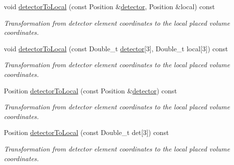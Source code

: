 \begin{DoxyCompactItemize}
void \hyperlink{class_d_d4hep_1_1_alignments_1_1_alignment_data_ae82379c6de7ca0295a39a876303377b5}{detector\+To\+Local} (const Position \&\hyperlink{class_d_d4hep_1_1_alignments_1_1_alignment_data_abf7096d1f2d3ed307c361f2d6d03710e}{detector}, Position \&local) const
\begin{DoxyCompactList}\small\item\em Transformation from detector element coordinates to the local placed volume coordinates. \end{DoxyCompactList}\item 
void \hyperlink{class_d_d4hep_1_1_alignments_1_1_alignment_data_a3cd2f3d20d1a277a1145a3257f2badf1}{detector\+To\+Local} (const Double\+\_\+t \hyperlink{class_d_d4hep_1_1_alignments_1_1_alignment_data_abf7096d1f2d3ed307c361f2d6d03710e}{detector}\mbox{[}3\mbox{]}, Double\+\_\+t local\mbox{[}3\mbox{]}) const
\begin{DoxyCompactList}\small\item\em Transformation from detector element coordinates to the local placed volume coordinates. \end{DoxyCompactList}\item 
Position \hyperlink{class_d_d4hep_1_1_alignments_1_1_alignment_data_a50c1fafca870e727b494ac639a4ba419}{detector\+To\+Local} (const Position \&\hyperlink{class_d_d4hep_1_1_alignments_1_1_alignment_data_abf7096d1f2d3ed307c361f2d6d03710e}{detector}) const
\begin{DoxyCompactList}\small\item\em Transformation from detector element coordinates to the local placed volume coordinates. \end{DoxyCompactList}\item 
Position \hyperlink{class_d_d4hep_1_1_alignments_1_1_alignment_data_acb3d2cf0447ab891e095afe0c33dc388}{detector\+To\+Local} (const Double\+\_\+t det\mbox{[}3\mbox{]}) const
\begin{DoxyCompactList}\small\item\em Transformation from detector element coordinates to the local placed volume coordinates. \end{DoxyCompactList}\end{DoxyCompactItemize}
